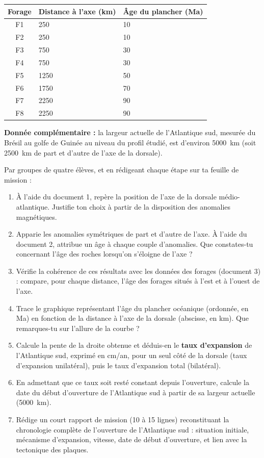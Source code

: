 \documentclass[11pt]{article}
\newcounter{popsec}
\newcounter{popsub}
\newcommand{\courssub}[1]{%
  \stepcounter{popsub}%
  \par\vspace{9pt}\noindent{\popxbold\fontsize{11.5}{13}\selectfont\color{popink}{\color{poporange}\thepopsec.\thepopsub}\hspace{6pt}#1}\par\nopagebreak\vspace{4pt}
}
\begin{document}
\begin{center}
\begin{tabularx}{\linewidth}{|c|X|X|}
\hline
\rowcolor{popblueL} \textbf{Forage} & \textbf{Distance à l'axe (km)} & \textbf{Âge du plancher (Ma)} \\
\hline
F1 & 250 & 10 \\
\hline
F2 & 250 & 10 \\
\hline
F3 & 750 & 30 \\
\hline
F4 & 750 & 30 \\
\hline
F5 & 1250 & 50 \\
\hline
F6 & 1750 & 70 \\
\hline
F7 & 2250 & 90 \\
\hline
F8 & 2250 & 90 \\
\hline
\end{tabularx}
\end{center}

\textbf{Donnée complémentaire :} la largeur actuelle de l'Atlantique sud, mesurée du Brésil au golfe de Guinée au niveau du profil étudié, est d'environ \SI{5000}{km} (soit \SI{2500}{km} de part et d'autre de l'axe de la dorsale).

\courssub{Consignes}

Par groupes de quatre élèves, et en rédigeant chaque étape sur ta feuille de mission :

\begin{enumerate}
\item À l'aide du document 1, repère la position de l'axe de la dorsale médio-atlantique. Justifie ton choix à partir de la disposition des anomalies magnétiques.
\item Apparie les anomalies symétriques de part et d'autre de l'axe. À l'aide du document 2, attribue un âge à chaque couple d'anomalies. Que constates-tu concernant l'âge des roches lorsqu'on s'éloigne de l'axe ?
\item Vérifie la cohérence de ces résultats avec les données des forages (document 3) : compare, pour chaque distance, l'âge des forages situés à l'est et à l'ouest de l'axe.
\item Trace le graphique représentant l'âge du plancher océanique (ordonnée, en Ma) en fonction de la distance à l'axe de la dorsale (abscisse, en km). Que remarques-tu sur l'allure de la courbe ?
\item Calcule la pente de la droite obtenue et déduis-en le \textbf{taux d'expansion} de l'Atlantique sud, exprimé en cm/an, pour un seul côté de la dorsale (taux d'expansion unilatéral), puis le taux d'expansion total (bilatéral).
\item En admettant que ce taux soit resté constant depuis l'ouverture, calcule la date du début d'ouverture de l'Atlantique sud à partir de sa largeur actuelle (\SI{5000}{km}).
\item Rédige un court rapport de mission (10 à 15 lignes) reconstituant la chronologie complète de l'ouverture de l'Atlantique sud : situation initiale, mécanisme d'expansion, vitesse, date de début d'ouverture, et lien avec la tectonique des plaques.
\end{enumerate}
\end{document}
